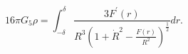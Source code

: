 \begin{equation}
16\pi G_{5}
\rho=\int_{-\delta}^\delta\frac{3F^{'}(r)}{R^3\left(1+\dot{R}^2-\frac{F(r)}{R^2}
\right)^{\frac{1}{2}}}dr.
\end{equation}

